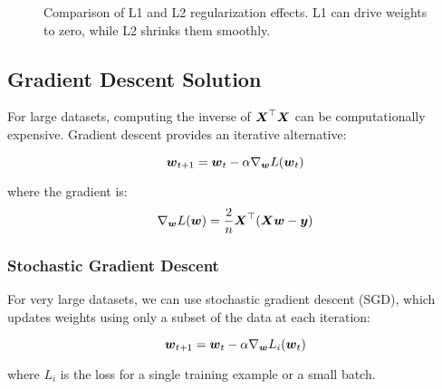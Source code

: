 \begin{figure}[htbp]
\centering
{}
\caption{Comparison of L1 and L2 regularization effects. L1 can drive weights to zero, while L2 shrinks them smoothly.}
\label{fig:regularization-comparison}
\end{figure}

\subsection{Gradient Descent Solution}

For large datasets, computing the inverse of $\boldsymbol{X}^\top \boldsymbol{X}$ can be computationally expensive. Gradient descent provides an iterative alternative:

\begin{equation}
\boldsymbol{w}_{t+1} = \boldsymbol{w}_t - \alpha \nabla_{\boldsymbol{w}} L(\boldsymbol{w}_t)
\end{equation}

where the gradient is:
\begin{equation}
\nabla_{\boldsymbol{w}} L(\boldsymbol{w}) = \frac{2}{n} \boldsymbol{X}^\top (\boldsymbol{X}\boldsymbol{w} - \boldsymbol{y})
\end{equation}

\subsubsection{Stochastic Gradient Descent}

For very large datasets, we can use stochastic gradient descent (SGD), which updates weights using only a subset of the data at each iteration:

\begin{equation}
\boldsymbol{w}_{t+1} = \boldsymbol{w}_t - \alpha \nabla_{\boldsymbol{w}} L_i(\boldsymbol{w}_t)
\end{equation}

where $L_i$ is the loss for a single training example or a small batch.

